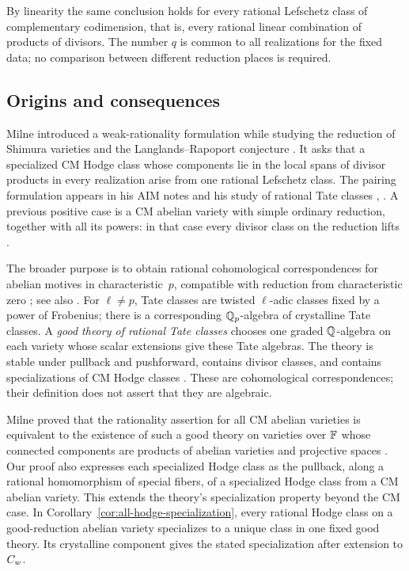 By linearity the same conclusion holds for every rational Lefschetz class
of complementary codimension, that is, every rational linear combination
of products of divisors. The number \(q\) is common to all realizations
for the fixed data; no comparison between different reduction places is
required.

\subsection{Origins and consequences}

Milne introduced a weak-rationality formulation while studying the
reduction of Shimura varieties and the Langlands--Rapoport conjecture
\cite[Conjecture~6.1(A)]{Milne2000}. It asks that a specialized CM
Hodge class whose components lie in the local spans of divisor products
in every realization arise from one rational Lefschetz class.
The pairing formulation appears in his
AIM notes and his study of rational Tate classes
\cite[Section~10]{MilneAIM2007}, \cite[Conjecture~4.1]{Milne2009}.
A previous positive case is a CM abelian variety with simple ordinary
reduction, together with all its powers: in that case every divisor
class on the reduction lifts \cite[Example~4.2]{Milne2009}.

The broader purpose is to obtain rational cohomological correspondences
for abelian motives in characteristic~\(p\), compatible with reduction
from characteristic zero \cite[Sections~5--6]{Milne2000}; see also
\cite[Introduction and Section~2]{Milne2025}. For \(\ell\ne p\),
Tate classes are twisted \(\ell\)-adic classes fixed by a power of
Frobenius; there is a corresponding \(\mathbb Q_p\)-algebra of crystalline
Tate classes. A \emph{good theory of rational Tate classes} chooses
one graded \(\mathbb Q\)-algebra on each variety whose scalar extensions
give these Tate algebras. The theory is stable under pullback and
pushforward, contains divisor classes, and contains specializations of
CM Hodge classes \cite[Definitions~2.1 and~3.1]{Milne2009}.
These are cohomological correspondences; their definition does not
assert that they are algebraic.

Milne proved that the rationality assertion for all CM abelian varieties
is equivalent to the existence of such a good theory on varieties over
\(\mathbb F\) whose connected components are products of abelian varieties
and projective spaces \cite[Theorem~4.5]{Milne2009}.
Our proof also expresses each specialized Hodge class as the pullback,
along a rational homomorphism of special fibers, of a specialized Hodge
class from a CM abelian variety. This extends the theory's
specialization property beyond the CM case.
In Corollary~\ref{cor:all-hodge-specialization}, every rational
Hodge class on a good-reduction abelian variety specializes to a unique
class in one fixed good theory. Its crystalline component gives the
stated specialization after extension to \(C_w\).

